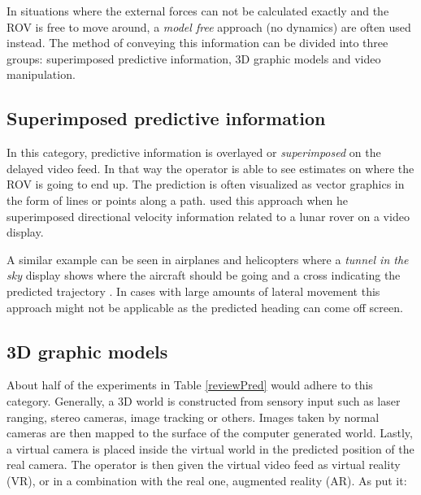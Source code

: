 In situations where the external forces can not be calculated exactly and the ROV is free to move around, a \emph{model free} approach (no dynamics) are often used instead. The method of conveying this information can be divided into three groups: superimposed predictive information, 3D graphic models and video manipulation.



\vspace{-2mm}
\subsection{Superimposed predictive information}

\vspace{-3mm}

In this category, predictive information is overlayed or \emph{superimposed} on the delayed video feed. In that way the operator is able to see estimates on where the ROV is going to end up. The prediction is often visualized as vector graphics in the form of lines or points along a path. \citet{Mathan1996} used this approach when he superimposed directional velocity information related to a lunar rover on a video display.

A similar example can be seen in airplanes and helicopters where a \emph{tunnel in the sky} display shows where the aircraft should be going and a cross indicating the predicted trajectory \citep{Grunwald1981}. In cases with large amounts of lateral movement this approach might not be applicable as the predicted heading can come off screen.

\subsection{3D graphic models}

About half of the experiments in Table \ref{reviewPred} would adhere to this category. Generally, a 3D world is constructed from sensory input such as laser ranging, stereo cameras, image tracking or others. Images taken by normal cameras are then mapped to the surface of the computer generated world. Lastly, a virtual camera is placed inside the virtual world in the predicted position of the real camera. The operator is then given the virtual video feed as virtual reality (VR), or in a combination with the real one, augmented reality (AR). As \citet{Hu2016} put it: 


